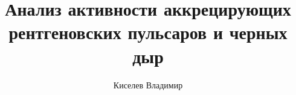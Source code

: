 \documentclass[10pt, pdf, hyperref={unicode}]{beamer}
\title{Анализ активности аккрецирующих рентгеновских пульсаров и черных дыр}
\author{Киселев Владимир}
\institute{Академический лицей <<Физико-техническая школа>>}
\date{}
\begin{document}
  \begin{frame}

	\titlepage


  \end{frame}

  \begin{frame}


  \end{frame}
\end{document}
